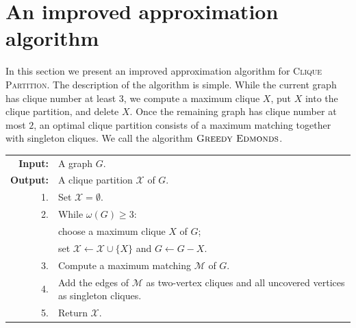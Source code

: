 \documentclass[a4paper,fleqn]{cas-sc}
\theoremstyle{remark}
\newtheorem{rem}[thm]{Remark}
\theoremstyle{plain}
\newcommand{\cp}{\textsc{Clique Partition}}
\newcommand{\edmonds}{{\textsc{Greedy Edmonds}}}
\begin{document}

    
\section{An improved approximation algorithm}
 In this section we present an improved approximation algorithm for \cp.  The description of the algorithm is simple. While the current graph has clique number at least $3$, we compute a maximum clique $X$, put $X$ into the clique partition, and delete $X$. Once the remaining graph has clique number at most $2$, an optimal clique partition consists of a maximum matching together with singleton cliques. We call the algorithm $\edmonds$.

\begin{algorithm}[h!]
\caption{\edmonds}
\begin{tabularx}{\columnwidth}{@{}rX@{}}
\textbf{Input:} & A graph $G$.\\
\textbf{Output:} & A clique partition $\mathcal X$ of $G$.\\[2pt]
1. & Set $\mathcal X=\emptyset$.\\
2. & While $\omega(G)\geq 3$:\\
   & \quad choose a maximum clique $X$ of $G$;\\
   & \quad set $\mathcal X\gets\mathcal X\cup\{X\}$ and $G\gets G-X$.\\
3. & Compute a maximum matching $\mathcal M$ of $G$.\\
4. & Add the edges of $\mathcal M$ as two-vertex cliques and all
uncovered vertices as singleton cliques.\\
5. & Return $\mathcal X$.
\end{tabularx}
\end{algorithm}
\end{document}

